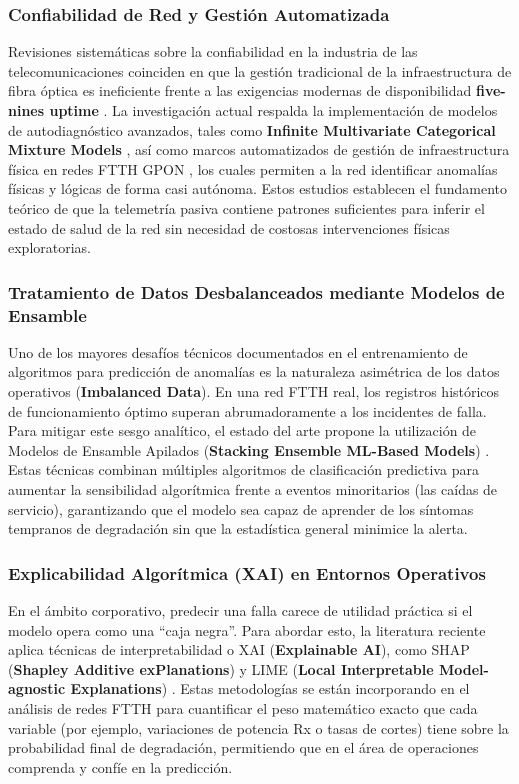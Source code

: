 \documentclass[12pt,a4paper]{article}
\begin{document}
\subsubsection{Confiabilidad de Red y Gestión Automatizada}
Revisiones sistemáticas sobre la confiabilidad en la industria de las telecomunicaciones coinciden en que la gestión tradicional de la infraestructura de fibra óptica es ineficiente frente a las exigencias modernas de disponibilidad 
\textbf{five-nines uptime} \cite{slr_reliability}. La investigación actual respalda la implementación de modelos de autodiagnóstico avanzados, tales como \textbf{Infinite Multivariate Categorical Mixture Models} \cite{infinite_mixture}, así como marcos automatizados de gestión de infraestructura física en redes FTTH GPON \cite{automated_gpon}, los cuales permiten a la red identificar anomalías físicas y lógicas de forma casi autónoma. Estos estudios establecen el fundamento teórico de que la telemetría pasiva contiene patrones suficientes para inferir el estado de salud de la red sin necesidad de costosas intervenciones físicas exploratorias.

\subsubsection{Tratamiento de Datos Desbalanceados mediante Modelos de Ensamble}
Uno de los mayores desafíos técnicos documentados en el entrenamiento de algoritmos para predicción de anomalías es la naturaleza asimétrica de los datos operativos (\textbf{Imbalanced Data}). En una red FTTH real, los registros históricos de funcionamiento óptimo superan abrumadoramente a los incidentes de falla. 
Para mitigar este sesgo analítico, el estado del arte propone la utilización de Modelos de Ensamble Apilados (\textbf{Stacking Ensemble ML-Based Models}) \cite{stacking_ensemble}. Estas técnicas combinan múltiples algoritmos de clasificación predictiva para aumentar la sensibilidad algorítmica frente a eventos minoritarios (las caídas de servicio), garantizando que el modelo sea capaz de aprender de los síntomas tempranos de degradación sin que la estadística general minimice la alerta.

\subsubsection{Explicabilidad Algorítmica (XAI) en Entornos Operativos}
En el ámbito corporativo, predecir una falla carece de utilidad práctica si el modelo opera como una ``caja negra''. Para abordar esto, la literatura reciente aplica técnicas de interpretabilidad o XAI (\textbf{Explainable AI}), como SHAP (\textbf{Shapley Additive exPlanations}) y 
LIME (\textbf{Local Interpretable Model-agnostic Explanations}) \cite{shap_lime}. Estas metodologías se están incorporando en el análisis de redes FTTH para cuantificar el peso matemático exacto que cada variable (por ejemplo, variaciones de potencia Rx o tasas de cortes) tiene sobre la probabilidad final de degradación, permitiendo que en el área de operaciones comprenda y confíe en la predicción.
\end{document}
